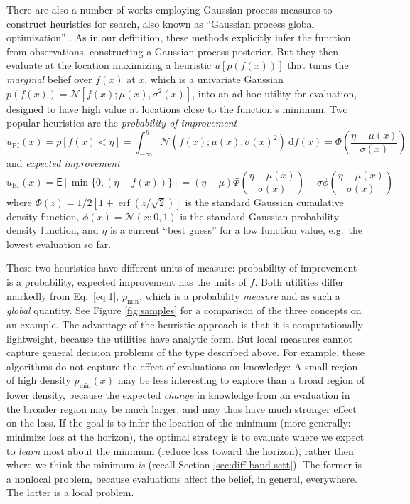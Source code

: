\documentclass[twoside,11pt]{article}
\newcommand{\N}{\mathcal{N}}
\renewcommand{\d}{\:\mathrm{d}}
\newcommand{\pmin}{p_{\min}}
\newcommand{\Exp}{\mathsf{E}}
\begin{document}
There are also a number of works employing Gaussian process measures
to construct heuristics for search, also known as ``Gaussian process
global optimization''
\citep{jones1998efficient,lizotte2008practical,osborne2009gaussian}.
As in our definition, these methods explicitly infer the function from
observations, constructing a Gaussian process posterior. But they then
evaluate at the location maximizing a heuristic $u[p(f(x))]$ that
turns the \emph{marginal} belief over $f(x)$ at $x$, which is a
univariate Gaussian $p(f(x))=\N[f(x);\mu(x),\sigma^2(x)]$, into an ad
hoc utility for evaluation, designed to have high value at locations
close to the function's minimum. Two popular heuristics are the
\emph{probability of improvement} \citep{lizotte2008practical}
\begin{equation}
  \label{eq:15}
  u_{\text{PI}}(x) = p[f(x)<\eta] = \int_{-\infty} ^\eta
  \N(f(x);\mu(x),\sigma(x)^2) \d f(x) = \Phi\left( \frac{\eta-\mu(x)}{\sigma(x)} \right)
\end{equation}
and \emph{expected improvement} \citep{jones1998efficient}
\begin{equation}
  \label{eq:16}
  u_{\text{EI}}(x) = \Exp[\min\{0,(\eta-f(x))\}] = (\eta - \mu)
  \Phi\left( \frac{\eta-\mu(x)}{\sigma(x)} \right) + \sigma \phi\left( \frac{\eta-\mu(x)}{\sigma(x)} \right)
\end{equation}
where $\Phi(z)=1/2[1+\operatorname{erf}(z/\sqrt{2})]$ is the standard
Gaussian cumulative density function, $\phi(x)=\N(x;0,1)$ is the
standard Gaussian probability density function, and $\eta$ is a
current ``best guess'' for a low function value, e.g.\ the lowest
evaluation so far. 

These two heuristics have different units of measure: probability of
improvement is a probability, expected improvement has the units of
$f$. Both utilities differ markedly from Eq.\ \eqref{eq:1}, $\pmin$,
which is a probability \emph{measure} and as such a \emph{global}
quantity. See Figure \ref{fig:samples} for a comparison of the three
concepts on an example. The advantage of the heuristic approach is
that it is computationally lightweight, because the utilities have
analytic form. But local measures cannot capture general decision
problems of the type described above. For example, these algorithms do
not capture the effect of evaluations on knowledge: A small region of
high density $\pmin(x)$ may be less interesting to explore than a
broad region of lower density, because the expected \emph{change} in
knowledge from an evaluation in the broader region may be much larger,
and may thus have much stronger effect on the loss. If the goal is to
infer the location of the minimum (more generally: minimize loss at
the horizon), the optimal strategy is to evaluate where we expect to
\emph{learn} most about the minimum (reduce loss toward the horizon),
rather then where we think the minimum \emph{is} (recall Section
\ref{sec:diff-band-sett}). The former is a nonlocal problem, because
evaluations affect the belief, in general, everywhere. The latter is a
local problem.
\end{document}
